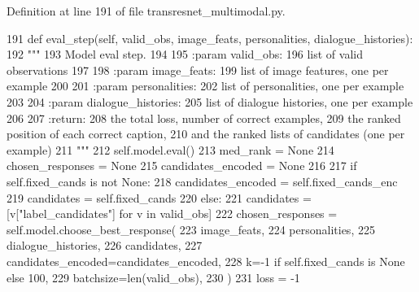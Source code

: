Definition at line 191 of file transresnet\+\_\+multimodal.\+py.


\begin{DoxyCode}
191     \textcolor{keyword}{def }eval\_step(self, valid\_obs, image\_feats, personalities, dialogue\_histories):
192         \textcolor{stringliteral}{"""}
193 \textcolor{stringliteral}{        Model eval step.}
194 \textcolor{stringliteral}{}
195 \textcolor{stringliteral}{        :param valid\_obs:}
196 \textcolor{stringliteral}{            list of valid observations}
197 \textcolor{stringliteral}{}
198 \textcolor{stringliteral}{        :param image\_feats:}
199 \textcolor{stringliteral}{            list of image features, one per example}
200 \textcolor{stringliteral}{}
201 \textcolor{stringliteral}{        :param personalities:}
202 \textcolor{stringliteral}{            list of personalities, one per example}
203 \textcolor{stringliteral}{}
204 \textcolor{stringliteral}{        :param dialogue\_histories:}
205 \textcolor{stringliteral}{            list of dialogue histories, one per example}
206 \textcolor{stringliteral}{}
207 \textcolor{stringliteral}{        :return:}
208 \textcolor{stringliteral}{            the total loss, number of correct examples,}
209 \textcolor{stringliteral}{            the ranked position of each correct caption,}
210 \textcolor{stringliteral}{            and the ranked lists of candidates (one per example)}
211 \textcolor{stringliteral}{        """}
212         self.model.eval()
213         med\_rank = \textcolor{keywordtype}{None}
214         chosen\_responses = \textcolor{keywordtype}{None}
215         candidates\_encoded = \textcolor{keywordtype}{None}
216 
217         \textcolor{keywordflow}{if} self.fixed\_cands \textcolor{keywordflow}{is} \textcolor{keywordflow}{not} \textcolor{keywordtype}{None}:
218             candidates\_encoded = self.fixed\_cands\_enc
219             candidates = self.fixed\_cands
220         \textcolor{keywordflow}{else}:
221             candidates = [v[\textcolor{stringliteral}{"label\_candidates"}] \textcolor{keywordflow}{for} v \textcolor{keywordflow}{in} valid\_obs]
222         chosen\_responses = self.model.choose\_best\_response(
223             image\_feats,
224             personalities,
225             dialogue\_histories,
226             candidates,
227             candidates\_encoded=candidates\_encoded,
228             k=-1 \textcolor{keywordflow}{if} self.fixed\_cands \textcolor{keywordflow}{is} \textcolor{keywordtype}{None} \textcolor{keywordflow}{else} 100,
229             batchsize=len(valid\_obs),
230         )
231         loss = -1

\end{DoxyCode}
